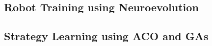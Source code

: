 \subsection{Robot Training using Neuroevolution}


\subsection{Strategy Learning using ACO and GAs}

